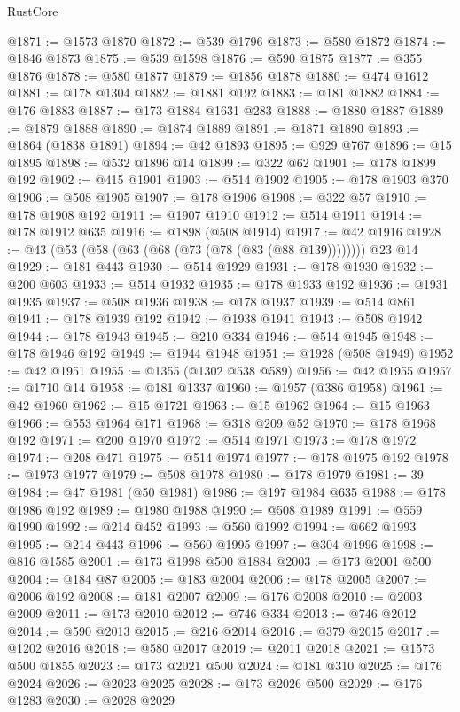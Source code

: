 \begin{lexlean}{RustCore}
\begin{coremodule}
@1871 := @1573 @1870
@1872 := @539 @1796
@1873 := @580 @1872
@1874 := @1846 @1873
@1875 := @539 @1598
@1876 := @590 @1875
@1877 := @355 @1876
@1878 := @580 @1877
@1879 := @1856 @1878
@1880 := @474 @1612
@1881 := @178 @1304
@1882 := @1881 @192
@1883 := @181 @1882
@1884 := @176 @1883
@1887 := @173 @1884 @1631 @283
@1888 := @1880 @1887
@1889 := @1879 @1888
@1890 := @1874 @1889
@1891 := @1871 @1890
@1893 := @1864 (@1838 @1891)
@1894 := @42 @1893
@1895 := @929 @767
@1896 := @15 @1895
@1898 := @532 @1896 @14
@1899 := @322 @62
@1901 := @178 @1899 @192
@1902 := @415 @1901
@1903 := @514 @1902
@1905 := @178 @1903 @370
@1906 := @508 @1905
@1907 := @178 @1906
@1908 := @322 @57
@1910 := @178 @1908 @192
@1911 := @1907 @1910
@1912 := @514 @1911
@1914 := @178 @1912 @635
@1916 := @1898 (@508 @1914)
@1917 := @42 @1916
@1928 := @43 (@53 (@58 (@63 (@68 (@73 (@78 (@83 (@88 @139)))))))) @23 @14
@1929 := @181 @443
@1930 := @514 @1929
@1931 := @178 @1930
@1932 := @200 @603
@1933 := @514 @1932
@1935 := @178 @1933 @192
@1936 := @1931 @1935
@1937 := @508 @1936
@1938 := @178 @1937
@1939 := @514 @861
@1941 := @178 @1939 @192
@1942 := @1938 @1941
@1943 := @508 @1942
@1944 := @178 @1943
@1945 := @210 @334
@1946 := @514 @1945
@1948 := @178 @1946 @192
@1949 := @1944 @1948
@1951 := @1928 (@508 @1949)
@1952 := @42 @1951
@1955 := @1355 (@1302 @538 @589)
@1956 := @42 @1955
@1957 := @1710 @14
@1958 := @181 @1337
@1960 := @1957 (@386 @1958)
@1961 := @42 @1960
@1962 := @15 @1721
@1963 := @15 @1962
@1964 := @15 @1963
@1966 := @553 @1964 @171
@1968 := @318 @209 @52
@1970 := @178 @1968 @192
@1971 := @200 @1970
@1972 := @514 @1971
@1973 := @178 @1972
@1974 := @208 @471
@1975 := @514 @1974
@1977 := @178 @1975 @192
@1978 := @1973 @1977
@1979 := @508 @1978
@1980 := @178 @1979
@1981 := 39
@1984 := @47 @1981 (@50 @1981)
@1986 := @197 @1984 @635
@1988 := @178 @1986 @192
@1989 := @1980 @1988
@1990 := @508 @1989
@1991 := @559 @1990
@1992 := @214 @452
@1993 := @560 @1992
@1994 := @662 @1993
@1995 := @214 @443
@1996 := @560 @1995
@1997 := @304 @1996
@1998 := @816 @1585
@2001 := @173 @1998 @500 @1884
@2003 := @173 @2001 @500
@2004 := @184 @87
@2005 := @183 @2004
@2006 := @178 @2005
@2007 := @2006 @192
@2008 := @181 @2007
@2009 := @176 @2008
@2010 := @2003 @2009
@2011 := @173 @2010
@2012 := @746 @334
@2013 := @746 @2012
@2014 := @590 @2013
@2015 := @216 @2014
@2016 := @379 @2015
@2017 := @1202 @2016
@2018 := @580 @2017
@2019 := @2011 @2018
@2021 := @1573 @500 @1855
@2023 := @173 @2021 @500
@2024 := @181 @310
@2025 := @176 @2024
@2026 := @2023 @2025
@2028 := @173 @2026 @500
@2029 := @176 @1283
@2030 := @2028 @2029

\end{coremodule}
\end{lexlean}
